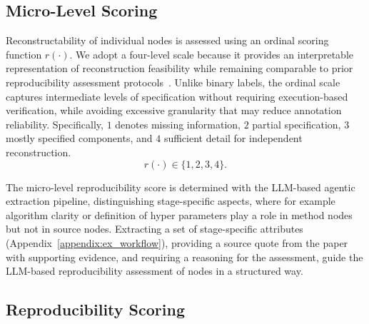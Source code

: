 \documentclass{article}
\begin{document}


\subsection{Micro-Level Scoring}

Reconstructability of individual nodes is assessed using an ordinal scoring function $r(\cdot)$. 
We adopt a four-level scale because it provides an interpretable representation of reconstruction feasibility while remaining comparable to prior reproducibility assessment protocols~\citep{stagge2019assessing,arroyo2022systematic,brodeur2024mass,held2024assessment,hu2025repro}. 
Unlike binary labels, the ordinal scale captures intermediate levels of specification without requiring execution-based verification, while avoiding excessive granularity that may reduce annotation reliability. 
Specifically, $1$ denotes missing information, $2$ partial specification, $3$ mostly specified components, and $4$ sufficient detail for independent reconstruction.
\begin{equation}
    r(\cdot)\in\{1,2,3,4\}.
\end{equation}


The micro-level reproducibility score is determined with the LLM-based agentic extraction pipeline, distinguishing stage-specific aspects, where for example algorithm clarity or definition of hyper parameters play a role in method nodes but not in source nodes.
Extracting a set of stage-specific attributes (Appendix~\ref{appendix:ex_workflow}), providing a source quote from the paper with supporting evidence, and requiring a reasoning for the assessment, guide the LLM-based reproducibility assessment of nodes in a structured way.

\subsection{Reproducibility Scoring}
\end{document}
